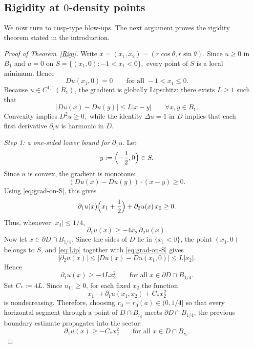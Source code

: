 \documentclass[reqno,11pt]{amsart}
\numberwithin{equation}{section}
\theoremstyle{remark}
\begin{document}
\subsection{Rigidity at $0$-density points}

We now turn to cusp-type blow-ups. The next argument proves the rigidity theorem
stated in the introduction.

\begin{proof}[Proof of Theorem~\ref{Rigi}]
Write
$x=(x_1,x_2)=(r\cos\theta,r\sin\theta).$
Since $u\ge0$ in $B_1$ and $u=0$ on
$S=\{(x_1,0): -1<x_1<0\},$
every point of $S$ is a local minimum. Hence
\begin{equation}\label{eq:grad-on-S}
D u(x_1,0)=0
\qquad\text{for all }-1<x_1\le0.
\end{equation}
Because $u\in C^{1,1}(B_1)$, the gradient is globally Lipschitz: there exists $L\ge1$ such that
\begin{equation}\label{eq:Lip}
|D u(x)-D u(y)|\le L|x-y|
\qquad\forall x,y\in B_1.
\end{equation}
Convexity implies $D^2u\ge0,$
while the identity $\Delta u=1$ in $D$ implies that each first derivative $\partial_i u$
is harmonic in $D$.

\medskip
\noindent\textit{Step 1: a one-sided lower bound for $\partial_1u$.}
Let
\[
y:=\Bigl(-\frac12,0\Bigr)\in S.
\]
Since $u$ is convex, the gradient is monotone:
\[
(D u(x)-D u(y))\cdot (x-y)\ge0.
\]
Using \eqref{eq:grad-on-S}, this gives
\[
\partial_1u(x)\Bigl(x_1+\frac12\Bigr)+\partial_2u(x)\,x_2\ge0.
\]
Thus, whenever $|x_1|\le1/4$,
\[
\partial_1u(x)\ge -4x_2\,\partial_2u(x).
\]
Now let $x\in \partial D\cap B_{1/4}$. Since the sides of $D$ lie in $\{x_1<0\}$, the point
$(x_1,0)$ belongs to $S$, and \eqref{eq:Lip} together with \eqref{eq:grad-on-S} gives
\[
|\partial_2u(x)|
\le |D u(x)-D u(x_1,0)|
\le L|x_2|.
\]
Hence
\[
\partial_1u(x)\ge -4Lx_2^2
\qquad\text{for all }x\in \partial D\cap B_{1/4}.
\]
Set
$C_\ast:=4L.$
Since $u_{11}\ge0$, for each fixed $x_2$ the function
\[
x_1\longmapsto \partial_1u(x_1,x_2)+C_\ast x_2^2
\]
is nondecreasing. Therefore, choosing $r_0=r_0(a)\in(0,1/4]$ so that every horizontal segment
through a point of $D\cap B_{r_0}$ meets $\partial D\cap B_{1/4}$, the previous boundary estimate
propagates into the sector:
\begin{equation}\label{eq:basic-lower}
\partial_1u(x)\ge -C_\ast x_2^2
\qquad\text{for all }x\in D\cap B_{r_0}.
\end{equation}


\end{proof}
\end{document}
